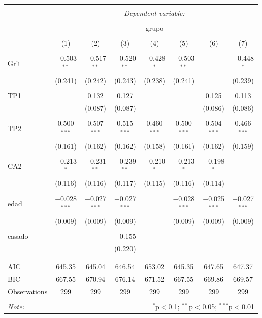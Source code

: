 \documentclass[]{article}
\begin{document}
\begin{table}[!htbp] \centering 
  \caption{} 
  \label{} 
\begin{tabular}{@{\extracolsep{5pt}}lccccccc} 
\\[-1.8ex]\hline 
\hline \\[-1.8ex] 
 & \multicolumn{7}{c}{\textit{Dependent variable:}} \\ 
\cline{2-8} 
\\[-1.8ex] & \multicolumn{7}{c}{grupo} \\ 
\\[-1.8ex] & (1) & (2) & (3) & (4) & (5) & (6) & (7)\\ 
\hline \\[-1.8ex] 
 Grit & $-$0.503$^{**}$ & $-$0.517$^{**}$ & $-$0.520$^{**}$ & $-$0.428$^{*}$ & $-$0.503$^{**}$ &  & $-$0.448$^{*}$ \\ 
  & (0.241) & (0.242) & (0.243) & (0.238) & (0.241) &  & (0.239) \\ 
  & & & & & & & \\ 
 TP1 &  & 0.132 & 0.127 &  &  & 0.125 & 0.113 \\ 
  &  & (0.087) & (0.087) &  &  & (0.086) & (0.086) \\ 
  & & & & & & & \\ 
 TP2 & 0.500$^{***}$ & 0.507$^{***}$ & 0.515$^{***}$ & 0.460$^{***}$ & 0.500$^{***}$ & 0.504$^{***}$ & 0.466$^{***}$ \\ 
  & (0.161) & (0.162) & (0.162) & (0.158) & (0.161) & (0.162) & (0.159) \\ 
  & & & & & & & \\ 
 CA2 & $-$0.213$^{*}$ & $-$0.231$^{**}$ & $-$0.239$^{**}$ & $-$0.210$^{*}$ & $-$0.213$^{*}$ & $-$0.198$^{*}$ &  \\ 
  & (0.116) & (0.116) & (0.117) & (0.115) & (0.116) & (0.114) &  \\ 
  & & & & & & & \\ 
 edad & $-$0.028$^{***}$ & $-$0.027$^{***}$ & $-$0.027$^{***}$ &  & $-$0.028$^{***}$ & $-$0.025$^{***}$ & $-$0.027$^{***}$ \\ 
  & (0.009) & (0.009) & (0.009) &  & (0.009) & (0.009) & (0.009) \\ 
  & & & & & & & \\ 
 casado &  &  & $-$0.155 &  &  &  &  \\ 
  &  &  & (0.220) &  &  &  &  \\ 
  & & & & & & & \\ 
\hline \\[-1.8ex] 
AIC & 645.35 & 645.04 & 646.54 & 653.02 & 645.35 & 647.65 & 647.37 \\ 
BIC & 667.55 & 670.94 & 676.14 & 671.52 & 667.55 & 669.86 & 669.57 \\ 
Observations & 299 & 299 & 299 & 299 & 299 & 299 & 299 \\ 
\hline 
\hline \\[-1.8ex] 
\textit{Note:}  & \multicolumn{7}{r}{$^{*}$p$<$0.1; $^{**}$p$<$0.05; $^{***}$p$<$0.01} \\ 
\end{tabular} 
\end{table}
\end{document}
